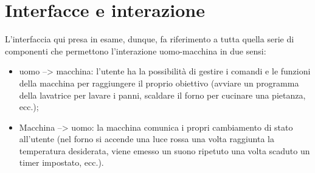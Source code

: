 \documentclass[11pt,a4paper]{article}
\begin{document}
\section{Interfacce e interazione}
L’interfaccia qui presa in esame, dunque, fa riferimento a tutta quella serie di componenti che permettono l’interazione uomo-macchina in due sensi:
\begin{itemize}
	\item uomo --> macchina: l’utente ha la possibilità di gestire i comandi e le funzioni della macchina per raggiungere il proprio obiettivo (avviare un programma della lavatrice per lavare i panni, scaldare il forno per cucinare una pietanza, ecc.);
	\item Macchina --> uomo: la macchina comunica i propri cambiamento di stato all’utente (nel forno si accende una luce rossa una volta raggiunta la temperatura desiderata, viene emesso un suono ripetuto una volta scaduto un timer impostato, ecc.).
\end{itemize}
\end{document}
